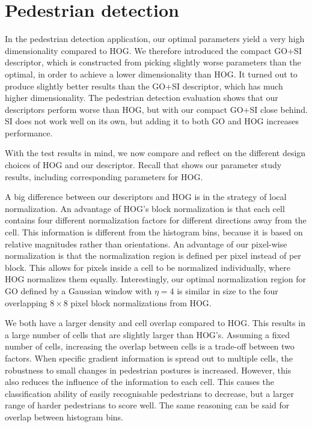 \documentclass[thesis.tex]{subfiles}
\begin{document}
\section{Pedestrian detection}
\label{sec:discussionOd}
In the pedestrian detection application, our optimal parameters yield a very high dimensionality compared to HOG. We therefore introduced the compact GO+SI descriptor, which is constructed from picking slightly worse parameters than the optimal, in order to achieve a lower dimensionality than HOG. It turned out to produce slightly better results than the GO+SI descriptor, which has much higher dimensionality. The pedestrian detection evaluation shows that our descriptors perform worse than HOG, but with our compact GO+SI close behind. SI does not work well on its own, but adding it to both GO and HOG increases performance.

With the test results in mind, we now compare and reflect on the different design choices of HOG and our descriptor. Recall that  shows our parameter study results, including corresponding parameters for HOG.

A big difference between our descriptors and HOG is in the strategy of local normalization. An advantage of HOG's block normalization is that each cell contains four different normalization factors for different directions away from the cell. This information is different from the histogram bins, because it is based on relative magnitudes rather than orientations. An advantage of our pixel-wise normalization is that the normalization region is defined per pixel instead of per block. This allows for pixels inside a cell to be normalized individually, where HOG normalizes them equally. Interestingly, our optimal normalization region for GO defined by a Gaussian window with $\eta = 4$ is similar in size to the four overlapping $8 \times 8$ pixel block normalizations from HOG.


We both have a larger density and cell overlap compared to HOG. This results in a large number of cells that are slightly larger than HOG's. Assuming a fixed number of cells, increasing the overlap between cells is a trade-off between two factors. When specific gradient information is spread out to multiple cells, the robustness to small changes in pedestrian postures is increased. However, this also reduces the influence of the information to each cell. This causes the classification ability of easily recognisable pedestrians to decrease, but a larger range of harder pedestrians to score well. The same reasoning can be said for overlap between histogram bins.
\end{document}

